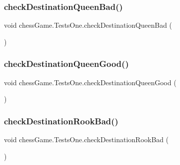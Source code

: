 \hypertarget{classchess_game_1_1_tests_one_a0c41ad0a4b9fe727288eb67f82065d6b}{}\label{classchess_game_1_1_tests_one_a0c41ad0a4b9fe727288eb67f82065d6b} 
\subsubsection{\texorpdfstring{check\+Destination\+Queen\+Bad()}{checkDestinationQueenBad()}}
{\footnotesize\ttfamily void chess\+Game.\+Tests\+One.\+check\+Destination\+Queen\+Bad (\begin{DoxyParamCaption}{ }\end{DoxyParamCaption})}

\hypertarget{classchess_game_1_1_tests_one_af3bc1e11e160379dd884aa09ebb6d5b4}{}\label{classchess_game_1_1_tests_one_af3bc1e11e160379dd884aa09ebb6d5b4} 
\subsubsection{\texorpdfstring{check\+Destination\+Queen\+Good()}{checkDestinationQueenGood()}}
{\footnotesize\ttfamily void chess\+Game.\+Tests\+One.\+check\+Destination\+Queen\+Good (\begin{DoxyParamCaption}{ }\end{DoxyParamCaption})}

\hypertarget{classchess_game_1_1_tests_one_a3a084e7f8ae5961032e344dc0971a30c}{}\label{classchess_game_1_1_tests_one_a3a084e7f8ae5961032e344dc0971a30c} 
\subsubsection{\texorpdfstring{check\+Destination\+Rook\+Bad()}{checkDestinationRookBad()}}
{\footnotesize\ttfamily void chess\+Game.\+Tests\+One.\+check\+Destination\+Rook\+Bad (\begin{DoxyParamCaption}{ }\end{DoxyParamCaption})}

